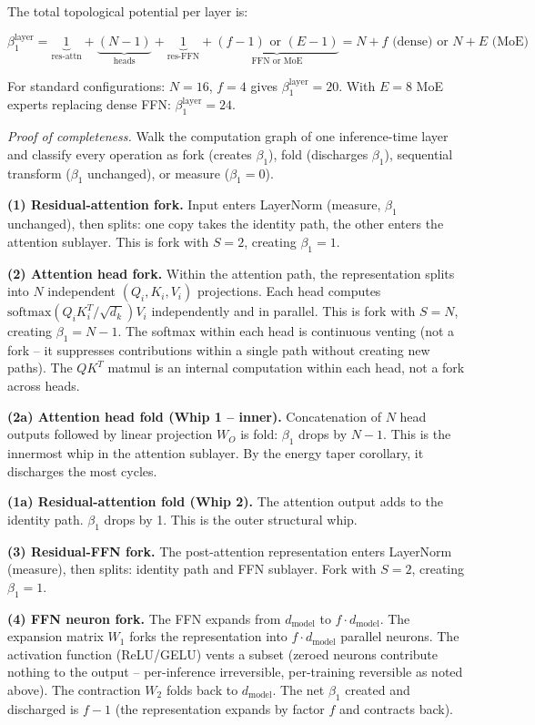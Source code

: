 \documentclass[
  11pt,
]{article}
\begin{document}
The total topological potential per layer is:

\[\beta_1^{\text{layer}} = \underbrace{1}_{\text{res-attn}} + \underbrace{(N-1)}_{\text{heads}} + \underbrace{1}_{\text{res-FFN}} + \underbrace{(f-1) \text{ or } (E-1)}_{\text{FFN or MoE}} = N + f \text{ (dense) or } N + E \text{ (MoE)}\]

For standard configurations: \(N = 16\), \(f = 4\) gives
\(\beta_1^{\text{layer}} = 20\). With \(E = 8\) MoE experts replacing
dense FFN: \(\beta_1^{\text{layer}} = 24\).

\emph{Proof of completeness.} Walk the computation graph of one
inference-time layer and classify every operation as fork (creates
\(\beta_1\)), fold (discharges \(\beta_1\)), sequential transform
(\(\beta_1\) unchanged), or measure (\(\beta_1 = 0\)).

\textbf{(1) Residual-attention fork.} Input enters LayerNorm (measure,
\(\beta_1\) unchanged), then splits: one copy takes the identity path,
the other enters the attention sublayer. This is fork with \(S = 2\),
creating \(\beta_1 = 1\).

\textbf{(2) Attention head fork.} Within the attention path, the
representation splits into \(N\) independent \((Q_i, K_i, V_i)\)
projections. Each head computes
\(\text{softmax}(Q_i K_i^T / \sqrt{d_k}) V_i\) independently and in
parallel. This is fork with \(S = N\), creating \(\beta_1 = N - 1\). The
softmax within each head is continuous venting (not a fork -- it
suppresses contributions within a single path without creating new
paths). The \(QK^T\) matmul is an internal computation within each head,
not a fork across heads.

\textbf{(2a) Attention head fold (Whip 1 -- inner).} Concatenation of
\(N\) head outputs followed by linear projection \(W_O\) is fold:
\(\beta_1\) drops by \(N - 1\). This is the innermost whip in the
attention sublayer. By the energy taper corollary, it discharges the
most cycles.

\textbf{(1a) Residual-attention fold (Whip 2).} The attention output
adds to the identity path. \(\beta_1\) drops by 1. This is the outer
structural whip.

\textbf{(3) Residual-FFN fork.} The post-attention representation enters
LayerNorm (measure), then splits: identity path and FFN sublayer. Fork
with \(S = 2\), creating \(\beta_1 = 1\).

\textbf{(4) FFN neuron fork.} The FFN expands from \(d_{\text{model}}\)
to \(f \cdot d_{\text{model}}\). The expansion matrix \(W_1\) forks the
representation into \(f \cdot d_{\text{model}}\) parallel neurons. The
activation function (ReLU/GELU) vents a subset (zeroed neurons
contribute nothing to the output -- per-inference irreversible,
per-training reversible as noted above). The contraction \(W_2\) folds
back to \(d_{\text{model}}\). The net \(\beta_1\) created and discharged
is \(f - 1\) (the representation expands by factor \(f\) and contracts
back).
\end{document}
